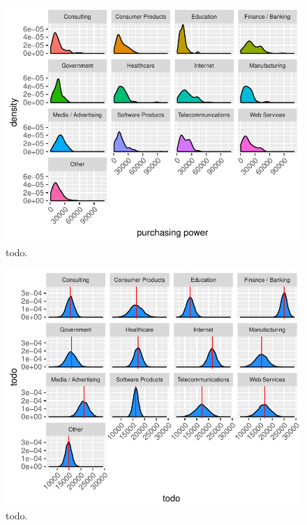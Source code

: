 \documentclass{article}
\begin{document}
\begin{figure}[H]
\centering
\includegraphics{report-040}
\caption{todo.}\label{fig_12}
\end{figure}




\begin{figure}[H]
\centering
\includegraphics{report-044}
\caption{todo.}\label{fig_13}
\end{figure}
\end{document}
